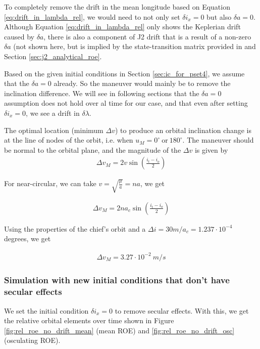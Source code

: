 To completely remove the drift in the mean longitude based on Equation \ref{eq:drift_in_lambda_rel}, we would need to not only set $\delta i_x = 0$ but also  $\delta a = 0$. Although Equation \ref{eq:drift_in_lambda_rel} only shows the Keplerian drift caused by $\delta a$, there is also a component of J2 drift that is a result of a non-zero $\delta a$ (not shown here, but is implied by the state-transition matrix provided in \cite{koenig2017new} and Section \ref{sec:j2_analytical_roe}. 

Based on the given initial conditions in Section \ref{sec:ic_for_pset4}, we assume that the $\delta a = 0$ already. So the maneuver would mainly be to remove the inclination difference. We will see in following sections that the $\delta a = 0$ assumption does not hold over al time for our case, and that even after setting $\delta i_x = 0$, we see a drift in $\delta \lambda$.

The optimal location (minimum $\Delta v$) to produce an orbital inclination change is at the line of nodes of the orbit, i.e. when $u_M = 0^\circ \ \text{or} \ 180^\circ$. The maneuver should be normal to the orbital plane, and the magnitude of the $\Delta v$ is given by
\begin{align}
    \Delta v_M = 2v\sin\left(\frac{i_t - i_o}{2}\right)
\end{align}

For near-circular, we can take $v = \sqrt{\frac{\mu}{a}} = na$, we get

\begin{align}
    \Delta v_M = 2na_c\sin\left(\frac{i_t - i_o}{2}\right)
\end{align}

Using the properties of the chief's orbit and a $\Delta i = 30 m/a_c = 1.237\cdot 10^{-4}$ degrees, we get

\begin{align}
    \Delta v_M = 3.27 \cdot10^{-2} \ m/s
\end{align}

\subsubsection{Simulation with new initial conditions that don't have secular effects}

We set the initial condition $\delta i_x = 0$ to remove secular effects. With this, we get the relative orbital elements over time shown in Figure \ref{fig:rel_roe_no_drift_mean} (mean ROE) and \ref{fig:rel_roe_no_drift_osc} (osculating ROE).

